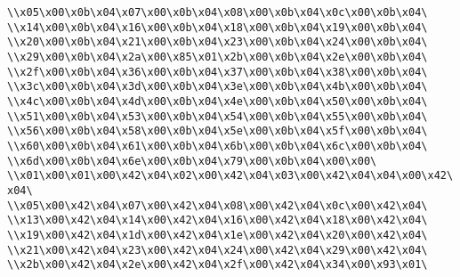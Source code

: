 \verb|\\x05\x00\x0b\x04\x07\x00\x0b\x04\x08\x00\x0b\x04\x0c\x00\x0b\x04\|\newline
\verb|\\x14\x00\x0b\x04\x16\x00\x0b\x04\x18\x00\x0b\x04\x19\x00\x0b\x04\|\newline
\verb|\\x20\x00\x0b\x04\x21\x00\x0b\x04\x23\x00\x0b\x04\x24\x00\x0b\x04\|\newline
\verb|\\x29\x00\x0b\x04\x2a\x00\x85\x01\x2b\x00\x0b\x04\x2e\x00\x0b\x04\|\newline
\verb|\\x2f\x00\x0b\x04\x36\x00\x0b\x04\x37\x00\x0b\x04\x38\x00\x0b\x04\|\newline
\verb|\\x3c\x00\x0b\x04\x3d\x00\x0b\x04\x3e\x00\x0b\x04\x4b\x00\x0b\x04\|\newline
\verb|\\x4c\x00\x0b\x04\x4d\x00\x0b\x04\x4e\x00\x0b\x04\x50\x00\x0b\x04\|\newline
\verb|\\x51\x00\x0b\x04\x53\x00\x0b\x04\x54\x00\x0b\x04\x55\x00\x0b\x04\|\newline
\verb|\\x56\x00\x0b\x04\x58\x00\x0b\x04\x5e\x00\x0b\x04\x5f\x00\x0b\x04\|\newline
\verb|\\x60\x00\x0b\x04\x61\x00\x0b\x04\x6b\x00\x0b\x04\x6c\x00\x0b\x04\|\newline
\verb|\\x6d\x00\x0b\x04\x6e\x00\x0b\x04\x79\x00\x0b\x04\x00\x00\|\newline
\verb|\\x01\x00\x01\x00\x42\x04\x02\x00\x42\x04\x03\x00\x42\x04\x04\x00\x42\x04\|\newline
\verb|\\x05\x00\x42\x04\x07\x00\x42\x04\x08\x00\x42\x04\x0c\x00\x42\x04\|\newline
\verb|\\x13\x00\x42\x04\x14\x00\x42\x04\x16\x00\x42\x04\x18\x00\x42\x04\|\newline
\verb|\\x19\x00\x42\x04\x1d\x00\x42\x04\x1e\x00\x42\x04\x20\x00\x42\x04\|\newline
\verb|\\x21\x00\x42\x04\x23\x00\x42\x04\x24\x00\x42\x04\x29\x00\x42\x04\|\newline
\verb|\\x2b\x00\x42\x04\x2e\x00\x42\x04\x2f\x00\x42\x04\x34\x00\x93\x01\|\newline
